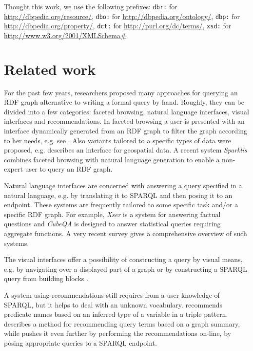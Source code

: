 \documentclass{llncs}
\begin{document}
Thought this work, we use the following prefixes: \texttt{dbr:} for \url{http://dbpedia.org/resource/}, \texttt{dbo:} for \url{http://dbpedia.org/ontology/}, \texttt{dbp:} for \url{http://dbpedia.org/property/}, \texttt{dct:} for \url{http://purl.org/dc/terms/}, \texttt{xsd:} for \url{http://www.w3.org/2001/XMLSchema#}.

\section{Related work}

For the past few years, researchers proposed many approaches for querying an RDF graph alternative to writing a formal query by hand.
Roughly, they can be divided into a few categories: faceted browsing, natural language interfaces, visual interfaces and recommendations.
In faceted browsing a user is presented with an interface dynamically generated from an RDF graph to filter the graph according to her needs, e.g. see \cite{DBLP:conf/semweb/OrenDD06}.
Also variants tailored to a specific types of data were proposed, e.g. \cite{leon2012map4rdf} describes an interface for geospatial data.
A recent system \emph{Sparklis} \cite{DBLP:conf/semweb/Ferre14a} combines faceted browsing with natural language generation to enable a non-expert user to query an RDF graph.

Natural language interfaces are concerned with answering a query specified in a natural language, e.g. by translating it to SPARQL and then posing it to an endpoint.
These systems are frequently tailored to some specific task and/or a specific RDF graph.
For example, \emph{Xser} \cite{DBLP:conf/clef/XuFZ14} is a system for answering factual questions and \emph{CubeQA} \cite{DBLP:conf/i-semantics/HoffnerL14} is designed to answer statistical queries requiring aggregate functions.
A very recent survey \cite{hoffner2016survey} gives a comprehensive overview of such systems.

The visual interfaces offer a possibility of constructing a query by visual means, e.g. by navigating over a displayed part of a graph \cite{DBLP:conf/semweb/ZainabSMZDH15} or by constructing a SPARQL query from building blocks \cite{DBLP:conf/semweb/BottoniC15}.

A system using recommendations still requires from a user knowledge of SPARQL, but it helps to deal with an unknown vocabulary.
\cite{DBLP:conf/hci/GombosK14} recommends predicate names based on an inferred type of a variable in a triple pattern.
\cite{DBLP:conf/dexaw/CampinasPCDT12} describes a method for recommending query terms based on a graph summary, while \cite{DBLP:conf/semweb/Campinas14} pushes it even further by performing the recommendations on-line, by posing appropriate queries to a SPARQL endpoint.
\end{document}
